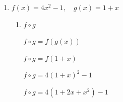 \documentclass{article}
\begin{document}
\begin{enumerate}
\begin{enumerate}
\begin{enumerate}
                \(Dom_{f \circ g} = \mathbb{R} \setminus \left\{-\frac{1}{\sqrt{2}}, \frac{1}{\sqrt{2}}\right\} \)
                
                \item[2.] \(g \circ f\)

                \( g \circ f = g(f(x)) \)
                
                \( g \circ f = g\left(\frac{2}{x}\right) \)
                
                \( g \circ f = 2\left(\frac{2}{x}\right)^2 - 1 \)
                
                \( g \circ f = \frac{8}{x^2} - 1 \)
                \vspace{\baselineskip}
                
                \( (g \circ f)(x) = \frac{8 - x^2}{x^2} \)
                \vspace{\baselineskip}

                Dom:
                
                \(x^2 \neq 0 \)
                
                \( |x| \neq 0 \)
                
                \( x \neq 0 \)
                \vspace{\baselineskip}

                Así, se define el dominio:
                
                \(Dom_{g \circ f} = \{x \in \mathbb{R} \, | \, x \neq 0\} \)
                
                \(Dom_{g \circ f} = \mathbb{R} \setminus \{0\} \)
            \end{enumerate}
            \vspace{\baselineskip}
            
        \item[b)] \(f(x) = 4x^2 - 1, \quad g(x) = 1 + x\)
            \begin{enumerate}
                \item[1.] \(f \circ g\)
                
                \( f \circ g = f(g(x)) \)
                
                \( f \circ g = f(1+x) \)
                
                \( f \circ g = 4(1+x)^2 - 1 \)
                
                \( f \circ g = 4(1+2x+x^2) - 1 \)
                

\end{enumerate}
\end{enumerate}
\end{enumerate}
\end{document}
